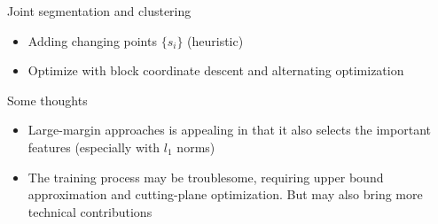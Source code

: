 \documentclass[12pt]{beamer}
\begin{document}
\begin{frame}{Joint segmentation and clustering}
	\begin{itemize}
		\item Adding changing points $\{s_i\}$ (heuristic)
		\\  
		\item Optimize with block coordinate descent and alternating optimization
	\end{itemize}
\end{frame}

\begin{frame}{Some thoughts}
	\begin{itemize}
		\item Large-margin approaches is appealing in that it also selects the important features (especially with $l_1$ norms)
		\item The training process may be troublesome, requiring upper bound approximation and cutting-plane optimization. But may also bring more technical contributions
	\end{itemize}
\end{frame}
\end{document}
